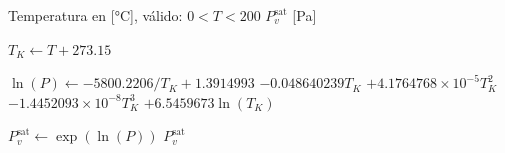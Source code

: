 
\begin{algorithm}[H]
\caption{Presión de Saturación (Hyland-Wexler)}
\label{alg:saturation}
\begin{algorithmic}[1]
    \Require Temperatura en [\si{\celsius}], válido: $0 < T < 200$
    \Ensure $P_v^{\text{sat}}$ [Pa]
    
    \State $T_K \gets T + 273.15$
    
    \State
    \State $\ln(P) \gets -5800.2206/T_K + 1.3914993$
    \State \hspace{1.8cm} $- 0.048640239 T_K$
    \State \hspace{1.8cm} $+ 4.1764768 \times 10^{-5} T_K^2$
    \State \hspace{1.8cm} $- 1.4452093 \times 10^{-8} T_K^3$
    \State \hspace{1.8cm} $+ 6.5459673 \ln(T_K)$
    
    \State
    \State $P_v^{\text{sat}} \gets \exp(\ln(P))$
    \State \Return $P_v^{\text{sat}}$
\EndFunction
\end{algorithmic}
\end{algorithm}